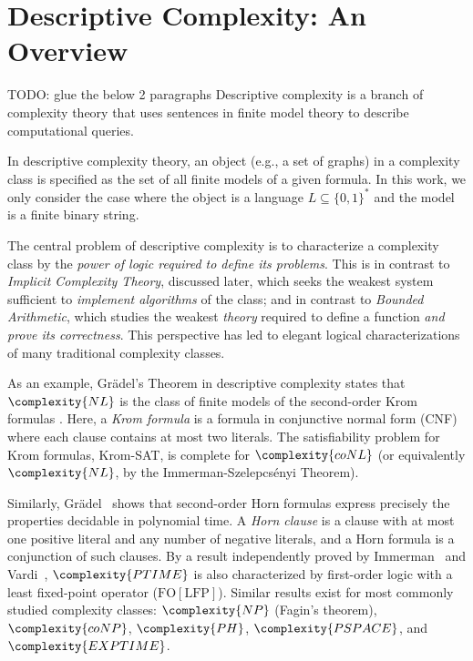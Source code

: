 
\section{Descriptive Complexity: An Overview}

TODO: glue the below 2 paragraphs
Descriptive complexity is a branch of complexity theory that uses sentences in finite model theory
to describe computational queries.

In descriptive complexity theory, an object (e.g., a set of graphs) in
a complexity class is specified as the set of all finite models of a given
formula. In this work, we only consider the case where the object is a language 
\(L \subseteq \{0,1\}^*\) and the model is a finite binary string.

The central problem of descriptive complexity is to characterize a
complexity class by the \emph{power of logic required to define its problems}.
This is in contrast to \emph{Implicit Complexity Theory}, discussed later,
which seeks the weakest system sufficient to \emph{implement algorithms}
of the class; and in contrast to \emph{Bounded Arithmetic}, which studies
the weakest \emph{theory} required to define a function \emph{and prove its correctness}.
This perspective has led to elegant logical characterizations of many traditional
complexity classes.

As an example, Grädel's Theorem in descriptive complexity states that
\(\complexity{NL}\) is the class of finite models of the second-order Krom formulas
\cite{GRADEL199235}.
Here, a \emph{Krom formula} is a formula in conjunctive normal form (CNF)
where each clause contains at most
two literals. The satisfiability problem for Krom formulas, Krom-SAT, is
complete for \(\complexity{coNL}\) (or equivalently \(\complexity{NL}\), by the Immerman-Szelepcsényi
Theorem).

Similarly, Grädel~\cite{GRADEL199235} shows that second-order Horn formulas
express precisely the properties decidable in polynomial time.
A \emph{Horn clause} is a clause with at most one positive literal and any number
of negative literals, and a Horn formula is a conjunction of such clauses.
By a result independently proved by Immerman~\cite{IMMERMAN198686}
and Vardi~\cite{10.1145/800070.802186},
\(\complexity{PTIME}\) is also characterized by first-order logic with a least fixed-point operator
(\(\mathrm{FO[LFP]}\)).
Similar results exist for most commonly studied complexity classes:
\(\complexity{NP}\) (Fagin's theorem), \(\complexity{coNP}\), \(\complexity{PH}\), \(\complexity{PSPACE}\), and \(\complexity{EXPTIME}\).

